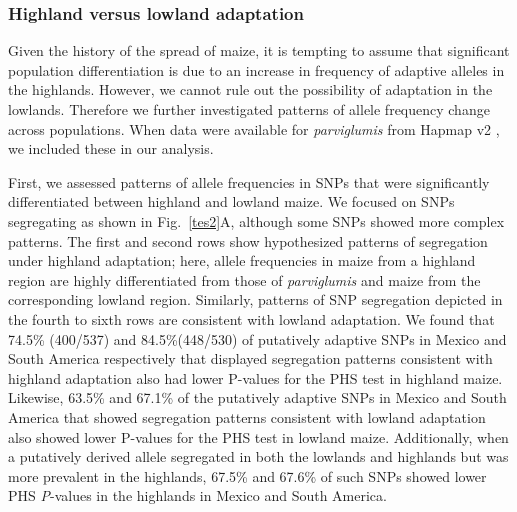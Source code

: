 {{\subsubsection{Highland versus lowland adaptation}

Given the history of the spread of maize, it is tempting to assume that significant population differentiation is due to an increase in frequency of adaptive alleles in the highlands.
However, we cannot rule out the possibility of adaptation in the lowlands.
Therefore we further investigated patterns of allele frequency change across populations.
When data were available for \emph{parviglumis} from Hapmap v2 \cite[]{Chia_2012_22660545,Hufford_2012_22660546}, we included these in our analysis.

First, we assessed patterns of allele frequencies in SNPs that were significantly differentiated between highland and lowland maize.
We focused on SNPs segregating as shown in Fig.~\ref{tes2}A, although some SNPs showed more complex patterns.
The first and second rows show hypothesized patterns of segregation under highland adaptation; here, allele frequencies in maize from a highland region are highly differentiated from those of \emph{parviglumis} and maize from the corresponding lowland region. %
Similarly, patterns of SNP segregation depicted in the fourth to sixth rows are consistent with lowland adaptation.
We found that 74.5\% (400/537) and 84.5\%(448/530) of putatively adaptive SNPs in Mexico and South America respectively that displayed segregation patterns consistent with highland adaptation also had lower P-values for the PHS test in highland maize.
Likewise, 63.5\% and 67.1\% of the putatively adaptive SNPs in Mexico and South America that showed segregation patterns consistent with lowland adaptation also showed lower P-values for the PHS test in lowland maize.
Additionally, when a putatively derived allele segregated in both the lowlands and highlands but was more prevalent in the highlands, 67.5\% and 67.6\% of such SNPs showed lower PHS \emph{P}-values in the highlands in Mexico and South America. 


}}
